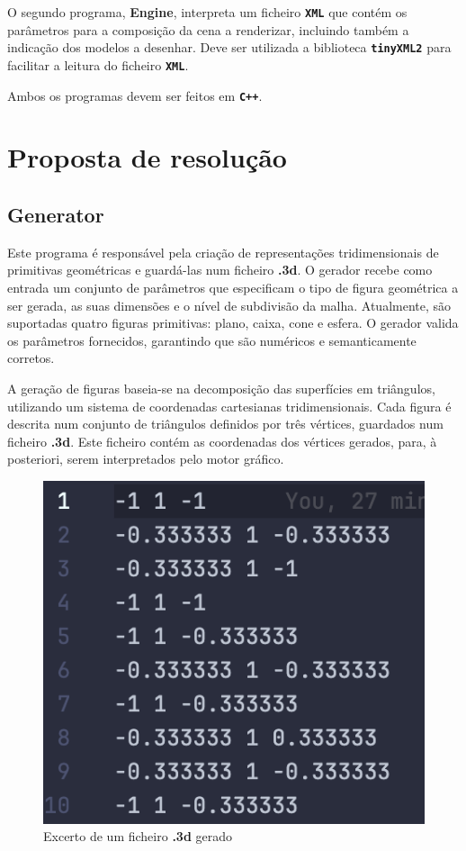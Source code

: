 \documentclass[12pt,a4paper]{report}%
\begin{document}
O segundo programa, \textbf{Engine}, interpreta um ficheiro \textbf{\texttt{XML}} que contém os parâmetros para a composição da cena a renderizar, incluindo também a indicação dos modelos a desenhar. Deve ser utilizada a biblioteca \textbf{\texttt{tinyXML2}} para facilitar a leitura do ficheiro \textbf{\texttt{XML}}. 

Ambos os programas devem ser feitos em \textbf{\texttt{C++}}. 

\section{Proposta de resolução} \label{sec:descricaoProblema} 

\subsection{Generator}
Este programa é responsável pela criação de representações tridimensionais de primitivas geométricas e guardá-las num ficheiro \textbf{.3d}. O gerador recebe como entrada um conjunto de parâmetros que especificam o tipo de figura geométrica a ser gerada, as suas dimensões e o nível de subdivisão da malha. Atualmente, são suportadas quatro figuras primitivas: plano, caixa, cone e esfera. O gerador valida os parâmetros fornecidos, garantindo que são numéricos e semanticamente corretos.

A geração de figuras baseia-se na decomposição das superfícies em triângulos, utilizando um sistema de coordenadas cartesianas tridimensionais. Cada figura é descrita num conjunto de triângulos definidos por três vértices, guardados num ficheiro \textbf{.3d}. Este ficheiro contém as coordenadas dos vértices gerados, para, à posteriori, serem interpretados pelo motor gráfico.

\begin{figure}[H]
    \centering
    \includegraphics[width=0.5\linewidth]{images/PontosGerados.png}
    \caption{Excerto de um ficheiro \textbf{.3d} gerado}
    \label{fig:pontos-gerados}
\end{figure}
\end{document}
